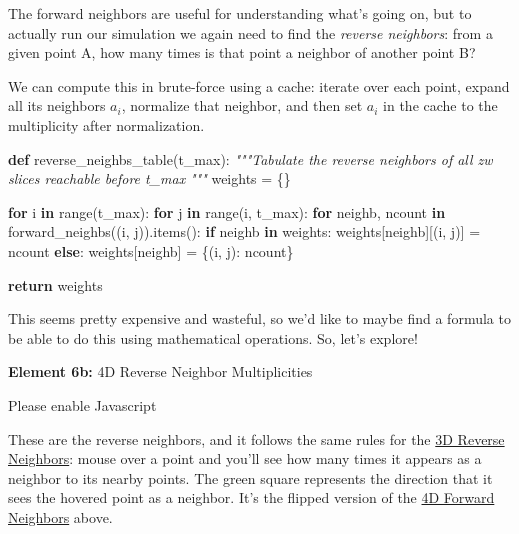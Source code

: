 \documentclass[]{article}
\newenvironment{Shaded}{}{}
\newcommand{\BuiltInTok}[1]{#1}
\newcommand{\CommentTok}[1]{\textcolor[rgb]{0.38,0.63,0.69}{\textit{#1}}}
\newcommand{\ControlFlowTok}[1]{\textcolor[rgb]{0.00,0.44,0.13}{\textbf{#1}}}
\newcommand{\KeywordTok}[1]{\textcolor[rgb]{0.00,0.44,0.13}{\textbf{#1}}}
\newcommand{\NormalTok}[1]{#1}
\newcommand{\OperatorTok}[1]{\textcolor[rgb]{0.40,0.40,0.40}{#1}}
\begin{document}
The forward neighbors are useful for understanding what's going on, but to
actually run our simulation we again need to find the \emph{reverse neighbors}:
from a given point A, how many times is that point a neighbor of another point
B?

We can compute this in brute-force using a cache: iterate over each point,
expand all its neighbors \(a_i\), normalize that neighbor, and then set \(a_i\)
in the cache to the multiplicity after normalization.

\begin{Shaded}
\begin{Highlighting}[]
\KeywordTok{def}\NormalTok{ reverse\_neighbs\_table(t\_max):}
    \CommentTok{"""Tabulate the reverse neighbors of all zw slices reachable before t\_max}
\CommentTok{    """}
\NormalTok{    weights }\OperatorTok{=}\NormalTok{ \{\}}

    \ControlFlowTok{for}\NormalTok{ i }\KeywordTok{in} \BuiltInTok{range}\NormalTok{(t\_max):}
        \ControlFlowTok{for}\NormalTok{ j }\KeywordTok{in} \BuiltInTok{range}\NormalTok{(i, t\_max):}
            \ControlFlowTok{for}\NormalTok{ neighb, ncount }\KeywordTok{in}\NormalTok{ forward\_neighbs((i, j)).items():}
                \ControlFlowTok{if}\NormalTok{ neighb }\KeywordTok{in}\NormalTok{ weights:}
\NormalTok{                    weights[neighb][(i, j)] }\OperatorTok{=}\NormalTok{ ncount}
                \ControlFlowTok{else}\NormalTok{:}
\NormalTok{                    weights[neighb] }\OperatorTok{=}\NormalTok{ \{(i, j): ncount\}}

    \ControlFlowTok{return}\NormalTok{ weights}
\end{Highlighting}
\end{Shaded}

This seems pretty expensive and wasteful, so we'd like to maybe find a formula
to be able to do this using mathematical operations. So, let's explore!

\leavevmode\hypertarget{golSyms4DReverse}{}%
\textbf{Element 6b:} 4D Reverse Neighbor Multiplicities

\leavevmode\hypertarget{golSyms4DReverseCont}{}%
Please enable Javascript

These are the reverse neighbors, and it follows the same rules for the
\protect\hyperlink{golSyms3DReverse}{3D Reverse Neighbors}: mouse over a point
and you'll see how many times it appears as a neighbor to its nearby points. The
green square represents the direction that it sees the hovered point as a
neighbor. It's the flipped version of the
\protect\hyperlink{golSyms4DForward}{4D Forward Neighbors} above.
\end{document}
